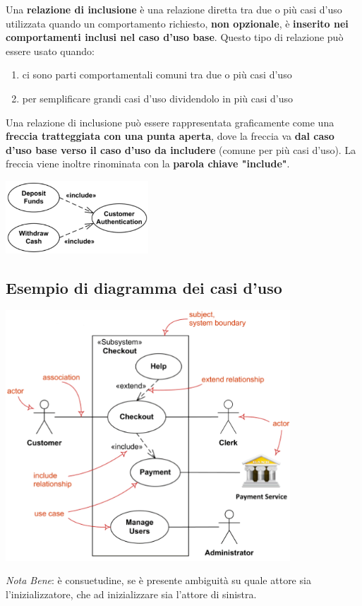 \documentclass{article}
\begin{document}
Una \textbf{relazione di inclusione} è una relazione diretta tra due o più casi d'uso utilizzata quando un comportamento richiesto,\textbf{ non opzionale}, è \textbf{inserito nei comportamenti inclusi nel caso d'uso base}. Questo tipo di relazione può essere usato quando:
\begin{enumerate}
    \renewcommand{\labelenumi}{-}
    \item ci sono parti comportamentali comuni tra due o più casi d'uso
    \item per semplificare grandi casi d'uso dividendolo in più casi d'uso
\end{enumerate}
Una relazione di inclusione può essere rappresentata graficamente come una \textbf{freccia tratteggiata con una punta aperta}, dove la freccia va \textbf{dal caso d'uso base verso il caso d'uso da includere} (comune per più casi d'uso). La freccia viene inoltre rinominata con la \textbf{parola chiave "include"}.
\begin{center}
    \includegraphics[width=0.4\textwidth]{foto 6.png}
\end{center}

\subsection*{Esempio di diagramma dei casi d'uso}
\large
\begin{center}
    \includegraphics[width=0.8\textwidth]{foto 7.png}
\end{center}
\textit{Nota Bene}: è consuetudine, se è presente ambiguità su quale attore sia l'inizializzatore, che ad inizializzare sia l'attore di sinistra.
\end{document}
